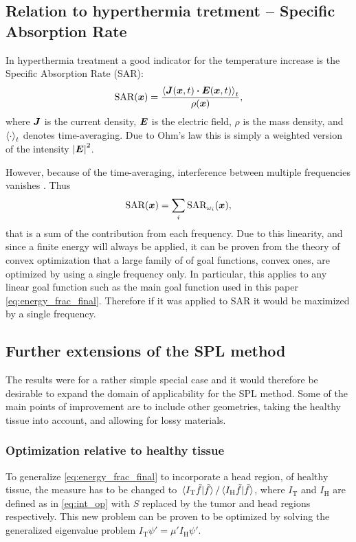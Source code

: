 \documentclass[11pt,a4paper, 
swedish,english %
]{article}
\newcommand{\tf}{\ensuremath{\tilde{f}}}
\begin{document}
\subsection{Relation to hyperthermia tretment -- Specific Absorption Rate}
\label{sec:SAR}
In hyperthermia treatment a good indicator for the temperature
increase is the Specific Absorption Rate (SAR): 
\begin{equation}
\text{SAR}(\vb*x)=
\frac{\ev{\vb*J(\vb*x,t)\vdot \vb*E(\vb*x,t)}_t}{\rho(\vb*x)},
\end{equation}
where $\vb*J$ is the current density, $\vb*E$ is the
electric field, $\rho$ is the mass density, and $\ev{\cdot}_t$ denotes
time-averaging. 
Due to Ohm's law this is simply a weighted version of the intensity
$\abs{\vb*E}^2$.

However, because of the time-averaging, interference between multiple
frequencies vanishes \cite{Martinsson}. Thus
\begin{equation}
\text{SAR}(\vb*x)=\sum_i\text{SAR}_{\omega_i}(\vb*x),
\end{equation}
that is a sum of the contribution from each frequency.
Due to this linearity, and since a finite energy will always be
applied, it can be proven from the theory of convex optimization
that a large family of of goal functions, convex ones, are optimized
by using a single frequency only\cite{Boyd}. In particular, this applies to any
linear goal function such as the main goal function used in this paper 
\eqref{eq:energy_frac_final}. Therefore if it was applied to SAR it
would be maximized by a single frequency.   



\subsection{Further extensions of the SPL method}
The results were for a rather simple special case and it would
therefore be desirable to expand the domain of applicability for the
SPL method. Some of the main points of improvement are to include other 
geometries, taking the healthy
tissue into account, and allowing for lossy materials.

\subsubsection{Optimization relative to healthy tissue}
To generalize \eqref{eq:energy_frac_final} to
incorporate a head region, of healthy tissue, the measure has to
be changed to $\ip*{I_\text{T}\tf}{\tf}/\ip*{I_\text{H}\tf}{\tf}$, where 
$I_\text{T}$ and $I_\text{H}$ are defined as in \eqref{eq:int_op} with
$S$ replaced by the tumor and head regions respectively. 
This new problem can be proven to be optimized by solving the
generalized eigenvalue problem $I_\text{T}\psi'=\mu'I_\text{H}\psi'$.
\end{document}
